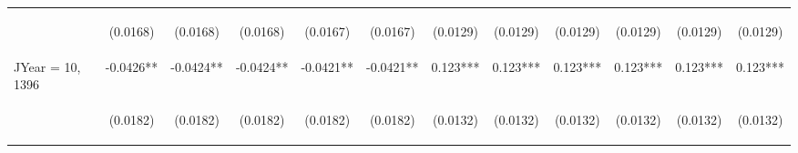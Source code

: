\documentclass[]{article}
\begin{document}
\begin{center}
\begin{tabular}{lccccccccccc}
\vspace{4pt} & \begin{footnotesize}(0.0168)\end{footnotesize} & \begin{footnotesize}(0.0168)\end{footnotesize} & \begin{footnotesize}(0.0168)\end{footnotesize} & \begin{footnotesize}(0.0167)\end{footnotesize} & \begin{footnotesize}(0.0167)\end{footnotesize} & \begin{footnotesize}(0.0129)\end{footnotesize} & \begin{footnotesize}(0.0129)\end{footnotesize} & \begin{footnotesize}(0.0129)\end{footnotesize} & \begin{footnotesize}(0.0129)\end{footnotesize} & \begin{footnotesize}(0.0129)\end{footnotesize} & \begin{footnotesize}(0.0129)\end{footnotesize} \\
JYear = 10, 1396 & -0.0426** & -0.0424** & -0.0424** & -0.0421** & -0.0421** & 0.123*** & 0.123*** & 0.123*** & 0.123*** & 0.123*** & 0.123*** \\
\vspace{4pt} & \begin{footnotesize}(0.0182)\end{footnotesize} & \begin{footnotesize}(0.0182)\end{footnotesize} & \begin{footnotesize}(0.0182)\end{footnotesize} & \begin{footnotesize}(0.0182)\end{footnotesize} & \begin{footnotesize}(0.0182)\end{footnotesize} & \begin{footnotesize}(0.0132)\end{footnotesize} & \begin{footnotesize}(0.0132)\end{footnotesize} & \begin{footnotesize}(0.0132)\end{footnotesize} & \begin{footnotesize}(0.0132)\end{footnotesize} & \begin{footnotesize}(0.0132)\end{footnotesize} & \begin{footnotesize}(0.0132)\end{footnotesize} \\

\end{tabular}
\end{center}
\end{document}
